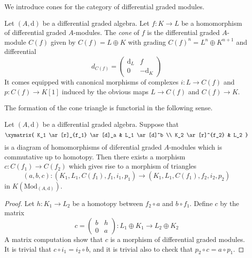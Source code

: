 \noindent
We introduce cones for the category of differential graded modules.

\begin{definition}
\label{definition-cone}
Let $(A, \text{d})$ be a differential graded algebra.
Let $f : K \to L$ be a homomorphism of differential graded $A$-modules.
The {\it cone} of $f$ is the differential graded $A$-module
$C(f)$ given by $C(f) = L \oplus K$ with grading
$C(f)^n = L^n \oplus K^{n + 1}$ and
differential
$$
d_{C(f)} =
\left(
\begin{matrix}
\text{d}_L & f \\
0 & -\text{d}_K
\end{matrix}
\right)
$$
It comes equipped with canonical morphisms of complexes $i : L \to C(f)$
and $p : C(f) \to K[1]$ induced by the obvious maps $L \to C(f)$
and $C(f) \to K$.
\end{definition}

\noindent
The formation of the cone triangle is functorial in the following sense.

\begin{lemma}
\label{lemma-functorial-cone}
Let $(A, \text{d})$ be a differential graded algebra.
Suppose that
$$
\xymatrix{
K_1 \ar[r]_{f_1} \ar[d]_a & L_1 \ar[d]^b \\
K_2 \ar[r]^{f_2} & L_2
}
$$
is a diagram of homomorphisms of diferential graded $A$-modules which is
commutative up to homotopy.
Then there exists a morphism $c : C(f_1) \to C(f_2)$ which gives rise to
a morphism of triangles
$$
(a, b, c) : (K_1, L_1, C(f_1), f_1, i_1, p_1) \to
(K_1, L_1, C(f_1), f_2, i_2, p_2)
$$
in $K(\text{Mod}_{(A, \text{d})})$.
\end{lemma}

\begin{proof}
Let $h : K_1 \to L_2$ be a homotopy between $f_2 \circ a$ and $b \circ f_1$.
Define $c$ by the matrix
$$
c =
\left(
\begin{matrix}
b & h \\
0 & a
\end{matrix}
\right) :
L_1 \oplus K_1 \to L_2 \oplus K_2
$$
A matrix computation show that $c$ is a morphism of differential
graded modules. It is trivial that $c \circ i_1 = i_2 \circ b$, and it is
trivial also to check that $p_2 \circ c = a \circ p_1$.
\end{proof}











